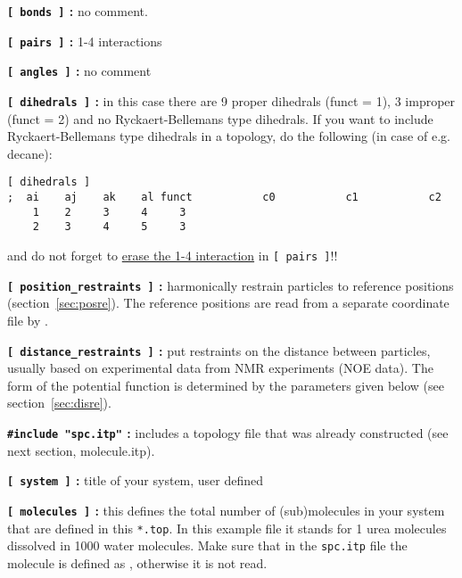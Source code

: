 {\bf \verb'[ bonds ]' :} no comment.

{\bf \verb'[ pairs ]' :} 1-4 interactions

{\bf \verb'[ angles ]' :} no comment

{\bf \verb'[ dihedrals ]' :} in this case there are 9 proper dihedrals
(funct = 1), 3 improper (funct = 2) and no Ryckaert-Bellemans type
dihedrals. If you want to include Ryckaert-Bellemans type dihedrals
in a topology, do the following (in case of e.g. decane):
\begin{verbatim}
[ dihedrals ]
;  ai    aj    ak    al funct           c0           c1           c2
    1    2     3     4     3 
    2    3     4     5     3
\end{verbatim}
and do not forget to \underline{erase the 1-4 interaction} 
in \verb'[ pairs ]'!!

{\bf \verb'[ position_restraints ]' :} harmonically restrain particles
to reference positions (section~\ref{sec:posre}). 
The reference positions are read from a 
separate coordinate file by .

{\bf \verb'[ distance_restraints ]' :} put restraints on the distance 
between particles, usually based on experimental data from NMR experiments
(NOE data). The form of the potential function is determined by the
parameters given below (see section~\ref{sec:disre}).

{\bf \verb'#include "spc.itp"' :} includes a topology file that was already
constructed (see next section, molecule.itp).

{\bf \verb'[ system ]' :} title of your system, user defined

{\bf \verb'[ molecules ]' :} this defines the total number of (sub)molecules
in your system that are defined in this \verb'*.top'. In this
example file it stands for 1 urea molecules dissolved in 1000 water
molecules. Make sure that in the \verb'spc.itp' file the molecule is
defined as , otherwise it is not read.

